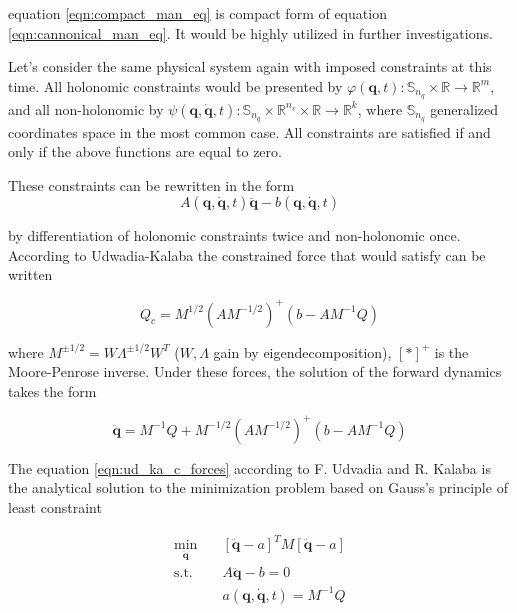 equation \ref{eqn:compact_man_eq} is compact form of equation 
\ref{eqn:cannonical_man_eq}. It would be highly utilized in further 
investigations.

Let's consider the same physical system again with imposed constraints at this time.
All holonomic constraints would be presented by 
$\varphi(\mathbf{q}, t): \mathbb{S}_{n_q} \times \mathbb{R} \rightarrow \mathbb{R}^m$, and 
all non-holonomic by 
$
\psi(\mathbf{q}, \dot{\mathbf{q}}, t): \mathbb{S}_{n_q} \times \mathbb{R}^{n_v} 
\times \mathbb{R} \rightarrow \mathbb{R}^k
$, where $\mathbb{S}_{n_q}$ generalized coordinates space in the most common case.
All constraints are satisfied if and only if the above functions are equal to zero.

These constraints can be rewritten in the form 
\begin{equation}
    \label{eqn:udwadia_const_form}
    A(\mathbf{q}, \dot{\mathbf{q}}, t) \ddot{\mathbf{q}} 
    - b(\mathbf{q}, \dot{\mathbf{q}}, t)
\end{equation}

by differentiation of holonomic constraints twice and non-holonomic once.
According to Udwadia-Kalaba the constrained force that would satisfy can be 
written

\begin{equation}
    \label{eqn:ud_ka_c_forces}
    Q_c = M^{1 / 2} (A M^{-1/2})^+(b - A M ^ {-1} Q)
\end{equation}

where $M^{\pm 1 / 2} = W \Lambda^{\pm 1/ 2} W^T$ ($W, \Lambda$ gain by 
eigendecomposition), $[*]^+$ is the Moore-Penrose inverse. Under these forces, 
the solution of the forward dynamics takes the form

\begin{equation}
    \label{eqn:forward_dyn_with_cf}
    \ddot{\mathbf{q}} = M^{-1}Q + M^{-1 / 2} (A M^{-1/2})^+(b - A M ^ {-1} Q)
\end{equation}

The equation \ref{eqn:ud_ka_c_forces} according to F. Udvadia and R. Kalaba
\cite{UdwadiaKalabaApproach} is the analytical solution to the minimization problem
based on Gauss's principle of least constraint

\begin{equation}
    \label{eqn:gauss_min_problem}
    \begin{aligned}
        \min_{\ddot{\mathbf{q}}} \quad &
        [\ddot{\mathbf{q}} - a]^T M [\ddot{\mathbf{q}} - a] \\
        \textrm{s.t.} \quad &
        A \ddot{\mathbf{q}} - b = 0 \\
        \quad &
        a(\mathbf{q}, \dot{\mathbf{q}}, t) = M^{-1} Q
    \end{aligned}
\end{equation}

